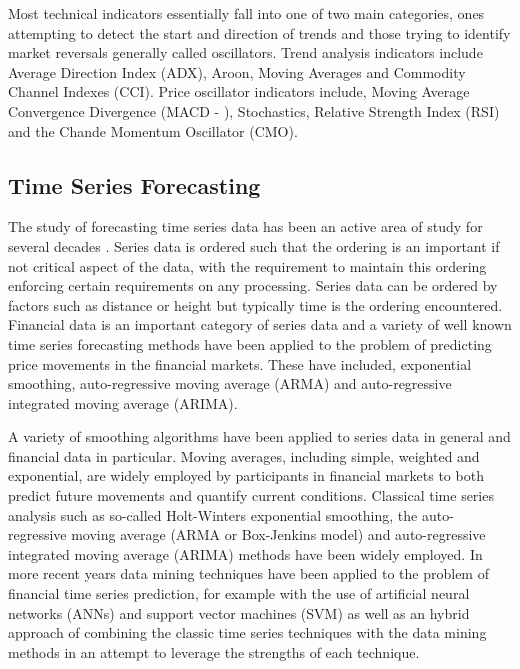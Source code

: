 Most technical indicators essentially fall into one of two main categories, ones attempting to detect the start and direction of trends and those trying to identify market reversals generally called oscillators. Trend analysis indicators include Average Direction Index (ADX), Aroon, Moving Averages and Commodity Channel Indexes (CCI). Price oscillator indicators include, Moving Average Convergence Divergence (MACD - \citep{appel2007understanding}), Stochastics, Relative Strength Index (RSI) and the Chande Momentum Oscillator (CMO).

\subsection{Time Series Forecasting}
The study of forecasting time series data has been an active area of study for several decades \citep{DeGooijer2006443}. Series data is ordered such that the ordering is an important if not critical aspect of the data, with the requirement to maintain this ordering enforcing certain requirements on any processing. Series data can be ordered by factors such as distance or height but typically time is the ordering encountered. Financial data is an important category of series data and a variety of well known time series forecasting methods have been applied to the problem of predicting price movements in the financial markets. These have included, exponential smoothing, auto-regressive moving average (ARMA)
and auto-regressive integrated moving average (ARIMA).

A variety of smoothing algorithms have been applied to series data in general and financial data in particular. Moving averages, including simple, weighted and exponential, are widely employed by participants in financial markets to both predict future movements and quantify current conditions. Classical time series analysis such as so-called Holt-Winters exponential smoothing, the auto-regressive moving average (ARMA or Box-Jenkins model) and auto-regressive integrated moving average (ARIMA) methods have been widely employed. In more recent years data mining techniques have been applied to the problem of financial time series prediction, for example with the use of artificial neural networks (ANNs) and support vector machines (SVM) as well as an hybrid approach of combining the classic time series techniques with the data mining methods in an attempt to leverage the strengths of each technique.


